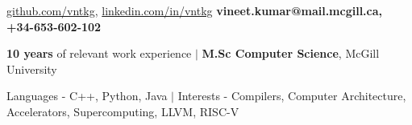 \documentclass{resume} %
\begin{document}
\begin{hSubsection}
{
    \href{https://github.com/vn7kr}{github.com/vntkg},
    \href{https://linkedin.com/in/vineet7kumar}{linkedin.com/in/vntkg}
}
{
	\textbf{vineet.kumar@mail.mcgill.ca, +34-653-602-102}
}
{%
}
\end{hSubsection}



\smallskip \smallskip 
\begin{rSection}{} \smallskip 
\begin{lSubsection} 
\item \textbf{10 years} of relevant work experience
        $\vert$ \textbf{M.Sc Computer Science}, McGill University
\item Languages - C++, Python, Java $\vert$ Interests - Compilers, Computer Architecture, Accelerators, Supercomputing, LLVM, RISC-V
\end{lSubsection}
\end{rSection}
\end{document}
